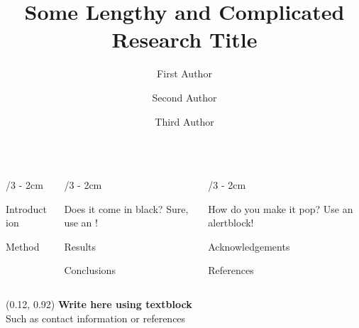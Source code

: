 \documentclass[landscape]{uioposter}
\title{Some Lengthy and Complicated Research Title}
\author
{%
    First Author%
    \and
    Second Author%
    \and
    Third Author%
}
\begin{document}
\begin{frame}
\begin{columns}[onlytextwidth]


\begin{column}{\textwidth/3 - 2cm}
    \begin{block}{Introduction}
        \lipsum[1]
    \end{block}

    \begin{block}{Method}
        \lipsum[2]
    \end{block}
\end{column}


\begin{column}{\textwidth/3 - 2cm}
    \begin{exampleblock}{Does it come in black?}
        Sure, use an !
    \end{exampleblock}

    \begin{block}{Results}
        \lipsum[75]
        \unskip
    \end{block}

    \begin{block}{Conclusions}
        \lipsum[6]
    \end{block}
\end{column}


\begin{column}{\textwidth/3 - 2cm}
    \begin{alertblock}{How do you make it pop?}
        Use an \alert{alertblock}!
    \end{alertblock}

    \begin{block}{Acknowledgements}
        \lipsum[4]
    \end{block}

    \begin{block}{References}
       \lipsum[6]
    \end{block}
\end{column}


\end{columns}


\begin{textblock}{0.5}(0.12, 0.92)
    \color{white}
    \sffamily
    \textbf{Write here using textblock}
    \\
    Such as contact information or references
\end{textblock}


\end{frame}
\end{document}
